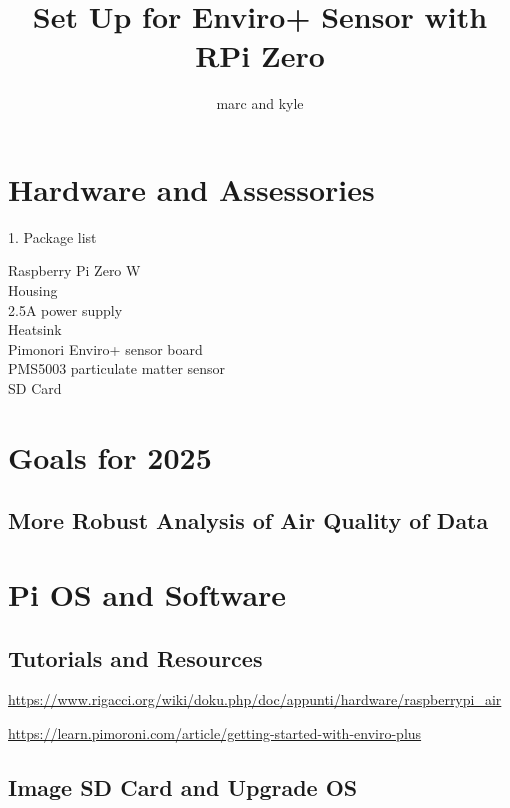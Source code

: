 \documentclass{article}
\author{marc and kyle}
\title{Set Up for Enviro+ Sensor with RPi Zero}
\begin{document}
\maketitle

\section{Hardware and Assessories}

1. Package list
\begin{description}
  \item[Raspberry Pi Zero W]
  \item[Housing]
  \item[2.5A power supply]
  \item[Heatsink]
  \item[Pimonori Enviro+ sensor board]
  \item[PMS5003 particulate matter sensor]
  \item[SD Card]
\end{description}

    
\section{Goals for 2025}

\subsection{More Robust Analysis of Air Quality of Data}


    

\section{Pi OS and Software}

\subsection{Tutorials and Resources}

\url{https://www.rigacci.org/wiki/doku.php/doc/appunti/hardware/raspberrypi_air}

\url{https://learn.pimoroni.com/article/getting-started-with-enviro-plus}



\subsection{Image SD Card and Upgrade OS}
\end{document}
